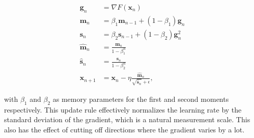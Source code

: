 \begin{equation}
    \begin{split}
        \bm{g}_n &= \nabla F(\bm{x}_n) \\
        \bm{m}_n &= \beta_1 \bm{m}_{n-1} + (1 - \beta_1)\bm{g}_n \\
        \bm{s}_n &= \beta_2 \bm{s}_{n-1} + (1 - \beta_2)\bm{g}_n^2 \\
        \hat{\bm{m}}_n &= \frac{\bm{m}_n}{1 - \beta_1^n} \\
        \hat{\bm{s}}_n &= \frac{\bm{s}_n}{1 - \beta_2^n} \\
        \bm{x}_{n+1} &= \bm{x}_n - \eta \frac{\hat{\bm{m}}_n}
        {\sqrt{\hat{\bm{s}}_n} + \epsilon} ,
    \end{split}
\end{equation}

with $\beta_1$ and $\beta_2$ as memory parameters for the first and
second moments respectively. This update rule
effectively normalizes the learning rate by the
standard deviation of the gradient, which is a natural
measurement scale. This also has the effect
of cutting off directions where the gradient varies
by a lot.
